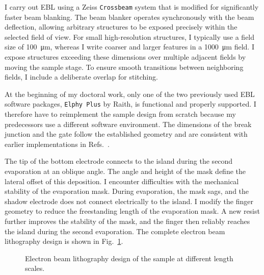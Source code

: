         I carry out EBL using a Zeiss \texttt{Crossbeam} system that is modified for significantly faster beam blanking. The beam blanker operates synchronously with the beam deflection, allowing arbitrary structures to be exposed precisely within the selected field of view. For small high-resolution structures, I typically use a field size of \qty{100}{\micro\meter}, whereas I write coarser and larger features in a \qty{1000}{\micro\meter} field. I expose structures exceeding these dimensions over multiple adjacent fields by moving the sample stage. To ensure smooth transitions between neighboring fields, I include a deliberate overlap for stitching.

        At the beginning of my doctoral work, only one of the two previously used EBL software packages, \texttt{Elphy Plus} by Raith, is functional and properly supported. I therefore have to reimplement the sample design from scratch because my predecessors use a different software environment. The dimensions of the break junction and the gate follow the established geometry and are consistent with earlier implementations in Refs.~\cite{lorenz_wechselspiel_2018,sprenger_interplay_2019,sobral_rey_interplay_2022}.

        The tip of the bottom electrode connects to the island during the second evaporation at an oblique angle. The angle and height of the mask define the lateral offset of this deposition. I encounter difficulties with the mechanical stability of the evaporation mask. During evaporation, the mask sags, and the shadow electrode does not connect electrically to the island. I modify the finger geometry to reduce the freestanding length of the evaporation mask. A new resist further improves the stability of the mask, and the finger then reliably reaches the island during the second evaporation. The complete electron beam lithography design is shown in Fig.~\ref{fig:methods:ebeam}.

        \begin{figure}[t]
            \centering
            \hfill
            \caption{Electron beam lithography design of the sample at different length scales.}
            \label{fig:methods:ebeam}
        \end{figure}

